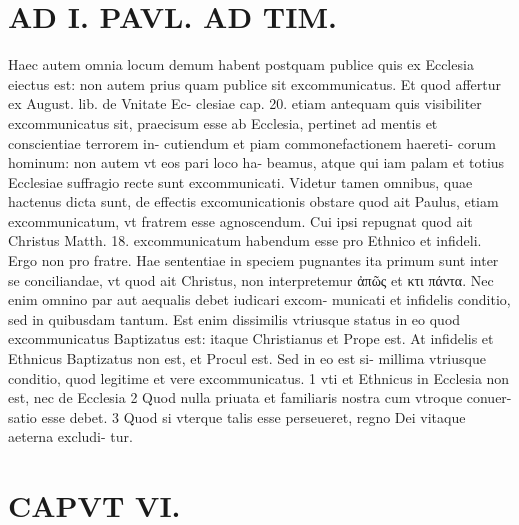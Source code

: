 \documentclass{article}
\begin{document}
\begin{pages}
\section*{AD I. PAVL. AD TIM. }
\marginpar{[ p.Reo. ]}\pstart Haec autem omnia locum demum habent postquam publice quis ex Ecclesia eiectus est: non autem prius quam publice sit excommunicatus. Et quod affertur ex August. lib.  de Vnitate Ec- clesiae cap. 20. etiam antequam quis visibiliter excommunicatus sit, praecisum esse ab Ecclesia, pertinet ad mentis et conscientiae terrorem in- cutiendum et piam commonefactionem haereti- corum hominum: non autem vt eos pari loco ha- beamus, atque qui iam palam et totius Ecclesiae suffragio recte sunt excommunicati. Videtur tamen omnibus, quae hactenus dicta sunt, de effectis excomunicationis obstare quod ait Paulus, etiam excommunicatum, vt fratrem esse agnoscendum. Cui ipsi repugnat quod ait Christus Matth. 18. excommunicatum habendum esse pro Ethnico et infideli. Ergo non pro fratre. Hae sententiae in speciem pugnantes ita primum sunt inter se conciliandae, vt quod ait Christus, non interpretemur ἀπῶς et κτι πάντα. Nec enim omnino par aut aequalis debet iudicari excom- municati et infidelis conditio, sed in quibusdam tantum. Est enim dissimilis vtriusque status in eo quod excommunicatus Baptizatus est: itaque Christianus et Prope est. At infidelis et Ethnicus Baptizatus non est, et Procul est. Sed in eo est si- millima vtriusque conditio, quod legitime et vere excommunicatus. 1 vti et Ethnicus in Ecclesia non est, nec de Ecclesia 2 Quod nulla priuata et familiaris nostra cum vtroque conuer- satio esse debet. 3 Quod si vterque talis esse perseueret, regno Dei vitaque aeterna excludi- tur.  \pend
\section*{CAPVT  VI. }
\marginpar{[ p.409 ]}\pstart {}
{}

\end{pages}
\end{document}
